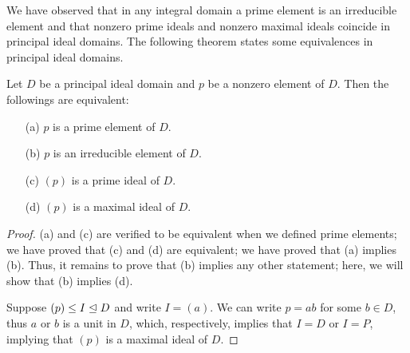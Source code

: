 We have observed that in any integral domain a prime element is an irreducible element and that nonzero prime ideals and nonzero maximal ideals coincide in principal ideal domains.
The following theorem states some equivalences in principal ideal domains.
\begin{thm}
    Let $D$ be a principal ideal domain and $p$ be a nonzero element of $D$.
    Then the followings are equivalent:
    \begin{enumerate}
        \item[(a)]
        {
            $p$ is a prime element of $D$.
        }
        \item[(b)]
        {
            $p$ is an irreducible element of $D$.
        }
        \item[(c)]
        {
            $(p)$ is a prime ideal of $D$.
        }
        \item[(d)]
        {
            $(p)$ is a maximal ideal of $D$.
        }
    \end{enumerate}
\end{thm}
\begin{proof}
    (a) and (c) are verified to be equivalent when we defined prime elements; we have proved that (c) and (d) are equivalent; we have proved that (a) implies (b).
    Thus, it remains to prove that (b) implies any other statement; here, we will show that (b) implies (d).

    Suppose $(p)\leq I\trianglelefteq D$ and write $I=(a)$.
    We can write $p=ab$ for some $b\in D$, thus $a$ or $b$ is a unit in $D$, which, respectively, implies that $I=D$ or $I=P$, implying that $(p)$ is a maximal ideal of $D$.
\end{proof}